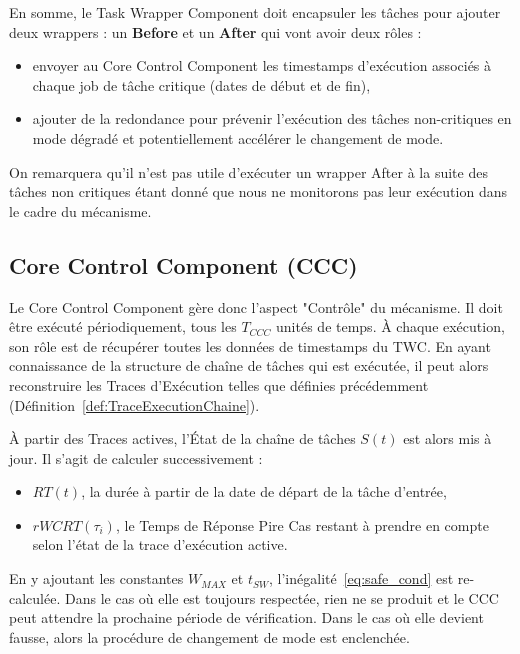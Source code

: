 \documentclass[french, a4paper, 11pt, twoside, pdftex]{StyleThese}
\begin{document}
        En somme, le Task Wrapper Component doit encapsuler les tâches pour ajouter deux wrappers : un \textbf{Before} et un \textbf{After} qui vont avoir deux rôles : 
        \begin{itemize}
        	\item envoyer au Core Control Component les timestamps d'exécution associés à chaque job de tâche critique (dates de début et de fin),
        	\item ajouter de la redondance pour prévenir l'exécution des tâches non-critiques en mode dégradé et potentiellement accélérer le changement de mode.
        \end{itemize}
		On remarquera qu'il n'est pas utile d'exécuter un wrapper After à la suite des tâches non critiques étant donné que nous ne monitorons pas leur exécution dans le cadre du mécanisme.

        \subsection{Core Control Component (CCC)}
        
        Le Core Control Component gère donc l'aspect "Contrôle" du mécanisme. Il doit être exécuté périodiquement, tous les $T_{CCC}$ unités de temps. À chaque exécution, son rôle est de récupérer toutes les données de timestamps du TWC. En ayant connaissance de la structure de chaîne de tâches qui est exécutée, il peut alors reconstruire les Traces d'Exécution telles que définies précédemment (Définition~\ref{def:TraceExecutionChaine}). 
        
        À partir des Traces actives, l'État de la chaîne de tâches $S(t)$ est alors mis à jour. Il s'agit de calculer successivement : 
        \begin{itemize}
        	\item $RT(t)$, la durée à partir de la date de départ de la tâche d'entrée,
        	\item $rWCRT(\tau_i)$, le Temps de Réponse Pire Cas restant à prendre en compte selon l'état de la trace d'exécution active.
        \end{itemize} 
	    En y ajoutant les constantes $W_{MAX}$ et $t_{SW}$, l'inégalité~\ref{eq:safe_cond} est re-calculée.
        Dans le cas où elle est toujours respectée, rien ne se produit et le CCC peut attendre la prochaine période de vérification. Dans le cas où elle devient fausse, alors la procédure de changement de mode est enclenchée. %
                
\end{document}

